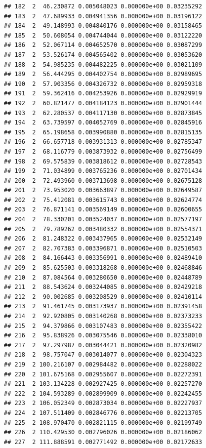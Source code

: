 \documentclass[article]{jss}\usepackage[]{graphicx}\usepackage[]{xcolor}
\makeatletter
\newenvironment{kframe}{%
 \def\at@end@of@kframe{}%
 \ifinner\ifhmode%
  \def\at@end@of@kframe{\end{minipage}}%
  \begin{minipage}{\columnwidth}%
 \fi\fi%
 \def\FrameCommand##1{\hskip\@totalleftmargin \hskip-\fboxsep
 \colorbox{shadecolor}{##1}\hskip-\fboxsep
     \hskip-\linewidth \hskip-\@totalleftmargin \hskip\columnwidth}%
 \MakeFramed {\advance\hsize-\width
   \@totalleftmargin\z@ \linewidth\hsize
   \@setminipage}}%
 {\par\unskip\endMakeFramed%
 \at@end@of@kframe}
\newenvironment{knitrout}{}{} %
\makeatother
\begin{document}
\begin{knitrout}
\begin{kframe}
\begin{verbatim}
## 182  2  46.230872 0.005048023 0.000000e+00 0.03235292
## 183  2  47.689933 0.004941356 0.000000e+00 0.03196122
## 184  2  49.148993 0.004840176 0.000000e+00 0.03158465
## 185  2  50.608054 0.004744044 0.000000e+00 0.03122220
## 186  2  52.067114 0.004652570 0.000000e+00 0.03087299
## 187  2  53.526174 0.004565402 0.000000e+00 0.03053620
## 188  2  54.985235 0.004482225 0.000000e+00 0.03021109
## 189  2  56.444295 0.004402754 0.000000e+00 0.02989695
## 190  2  57.903356 0.004326732 0.000000e+00 0.02959318
## 191  2  59.362416 0.004253926 0.000000e+00 0.02929919
## 192  2  60.821477 0.004184123 0.000000e+00 0.02901444
## 193  2  62.280537 0.004117130 0.000000e+00 0.02873845
## 194  2  63.739597 0.004052769 0.000000e+00 0.02845916
## 195  2  65.198658 0.003990880 0.000000e+00 0.02815135
## 196  2  66.657718 0.003931313 0.000000e+00 0.02785347
## 197  2  68.116779 0.003873932 0.000000e+00 0.02756499
## 198  2  69.575839 0.003818612 0.000000e+00 0.02728543
## 199  2  71.034899 0.003765236 0.000000e+00 0.02701434
## 200  2  72.493960 0.003713698 0.000000e+00 0.02675128
## 201  2  73.953020 0.003663897 0.000000e+00 0.02649587
## 202  2  75.412081 0.003615743 0.000000e+00 0.02624774
## 203  2  76.871141 0.003569149 0.000000e+00 0.02600655
## 204  2  78.330201 0.003524037 0.000000e+00 0.02577197
## 205  2  79.789262 0.003480332 0.000000e+00 0.02554371
## 206  2  81.248322 0.003437965 0.000000e+00 0.02532149
## 207  2  82.707383 0.003396871 0.000000e+00 0.02510503
## 208  2  84.166443 0.003356991 0.000000e+00 0.02489410
## 209  2  85.625503 0.003318268 0.000000e+00 0.02468846
## 210  2  87.084564 0.003280650 0.000000e+00 0.02448789
## 211  2  88.543624 0.003244085 0.000000e+00 0.02429218
## 212  2  90.002685 0.003208529 0.000000e+00 0.02410114
## 213  2  91.461745 0.003173937 0.000000e+00 0.02391458
## 214  2  92.920805 0.003140268 0.000000e+00 0.02373233
## 215  2  94.379866 0.003107483 0.000000e+00 0.02355422
## 216  2  95.838926 0.003075546 0.000000e+00 0.02338010
## 217  2  97.297987 0.003044421 0.000000e+00 0.02320982
## 218  2  98.757047 0.003014077 0.000000e+00 0.02304323
## 219  2 100.216107 0.002984482 0.000000e+00 0.02288022
## 220  2 101.675168 0.002955607 0.000000e+00 0.02272391
## 221  2 103.134228 0.002927425 0.000000e+00 0.02257270
## 222  2 104.593289 0.002899909 0.000000e+00 0.02242455
## 223  2 106.052349 0.002873034 0.000000e+00 0.02227937
## 224  2 107.511409 0.002846776 0.000000e+00 0.02213705
## 225  2 108.970470 0.002821115 0.000000e+00 0.02199749
## 226  2 110.429530 0.002796026 0.000000e+00 0.02186062
## 227  2 111.888591 0.002771492 0.000000e+00 0.02172633

\end{verbatim}
\end{kframe}
\end{knitrout}
\end{document}
